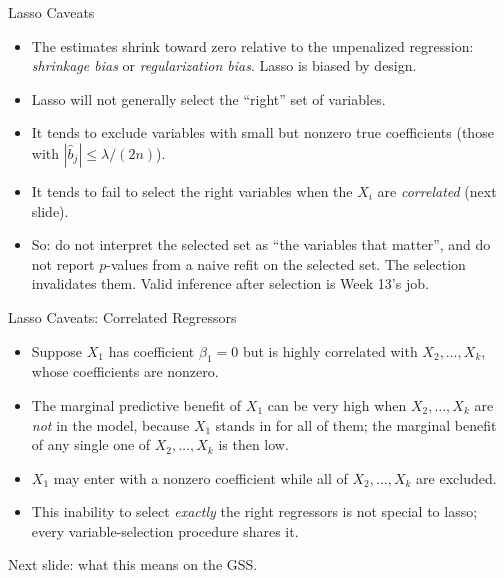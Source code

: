 \documentclass[aspectratio=169,11pt,xcolor=dvipsnames]{beamer}
\newcommand{\core}{\,\raisebox{0.6pt}{\textcolor{corestar}{$\bigstar$}}}
\begin{document}
\begin{frame}{Lasso Caveats\core}
\begin{itemize}\itemsep4pt
  \item The estimates shrink toward zero relative to the unpenalized regression:
        \textit{shrinkage bias} or \textit{regularization bias}. Lasso is biased
        by design.
  \item Lasso will not generally select the ``right'' set of variables.
  \item It tends to exclude variables with small but nonzero true
        coefficients (those with $|\hat b_j| \leq \lambda/(2n)$).
  \item It tends to fail to select the right variables when the $X_i$ are
        \textit{correlated} (next slide).
  \item \alert{So: do not interpret the selected set as ``the variables that
        matter'', and do not report $p$-values from a naive refit on the
        selected set.} The selection invalidates them. Valid inference after
        selection is Week 13's job.
\end{itemize}
\end{frame}

\begin{frame}{Lasso Caveats: Correlated Regressors}
\begin{itemize}\itemsep4pt
  \item Suppose $X_1$ has coefficient $\beta_1 = 0$ but is highly correlated with
        $X_2, \dots, X_k$, whose coefficients are nonzero.
  \item The marginal predictive benefit of $X_1$ can be very high when
        $X_2, \dots, X_k$ are \emph{not} in the model, because $X_1$ stands in for
        all of them; the marginal benefit of any single one of $X_2, \dots, X_k$
        is then low.
  \item $X_1$ may enter with a nonzero coefficient while all of $X_2, \dots, X_k$
        are excluded.
  \item This inability to select \emph{exactly} the right regressors is not special
        to lasso; every variable-selection procedure shares it.
\end{itemize}
\vskip3pt
{\small Next slide: what this means on the GSS.}
\end{frame}
\end{document}
